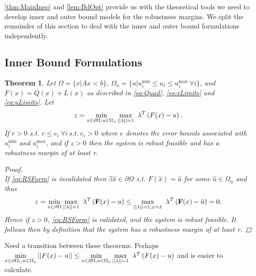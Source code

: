 \documentclass[11pt]{article}
\theoremstyle{plain}
\newtheorem{thm}{Theorem}[section]
\theoremstyle{definition}
\theoremstyle{remark}
\begin{document}
\cref{thm:MainIneq} and \cref{lem:BdOpt} provide us with the theoretical tools we need to develop inner and outer bound models for the robustness margins. We split the remainder of this section to deal with the inner and outer bound formulations independently. 


\subsection{Inner Bound Formulations}

\begin{thm}
Let $\Omega=\{x| Ax< b\}$, $\Omega_{u}=\{u| u^{\min}_i\leq u_i \leq u^{\max}_i \ \forall i \}$, and $F(x)=Q(x)+L(x)$ as described in \eqref{eq:Quad}, \eqref{eq:xLimits} and \eqref{eq:uLimits}. Let
$$z = \min\limits_{x\in \partial \Omega, u\in \Omega_{u} }\max\limits_{||\bold{\lambda}||=1}\ \bold{\lambda}^T\left(F(x)-u\right).$$
If $r>0$ s.t. $r\leq e_i \ \forall i \ s.t. \ e_i>0$ where $e$ denotes the error bounds associated with $ u^{\min}_i$ and $ u^{\max}_i$, and if $z>0$ then the system is robust feasible and has a robustness margin of at least r.

\begin{proof} \ \\
If \eqref{eq:RSForm} is invalidated then $\exists \hat{x}\in\partial\Omega$ s.t. $F(\hat{x})=\hat{u}$ for some $\hat{u}\in\Omega_{u}$ and thus $$z = \min\limits_{x\in \partial \Omega}\max\limits_{||\bold{\lambda}||=1}\ \bold{\lambda}^T\left(\bold{F}(x)-u\right)\leq \max\limits_{||\bold{\lambda}||=1, x=\hat{x}}\ \bold{\lambda}^T\left(\bold{F}(x)-\hat{u}\right)=0.$$ 
Hence if $z>0$, \eqref{eq:RSForm} is validated, and the system is robust feasible. It follows then by definition that the system has a robustness margin of at least r.
\end{proof}
\end{thm}


{\color{blue} Need a transition between these theorems. Perhaps $\min\limits_{x\in\partial\Omega_i, u\in \Omega_u} ||F(x)-u||\leq \min\limits_{x\in \partial \Omega, u\in \Omega_{u} }\max\limits_{||\bold{\lambda}||=1}\ \bold{\lambda}^T\left(F(x)-u\right)$ and is easier to calculate.}
\end{document}
